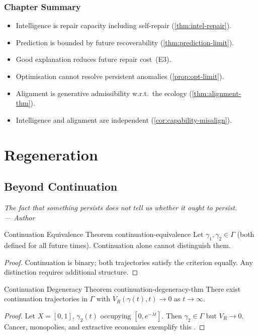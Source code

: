 \documentclass[12pt,twoside,openright]{book}
\newenvironment{epigraph}[2]{%
  \vspace{1em}\begin{flushright}
  \begin{minipage}{0.72\textwidth}
  \itshape\small #1\\[0.4em]
  \upshape\footnotesize\sffamily\color{DistGray}--- #2
  \end{minipage}\end{flushright}\vspace{1.5em}}{}
\newenvironment{chapsummary}{%
  \begin{tcolorbox}[colback=DistBlue!5,colframe=DistBlue,
    title={\faBookOpen\enspace Summary},
    fonttitle=\sffamily\bfseries\color{white},
    attach boxed title to top left={yshift=-2mm,xshift=4mm},
    boxed title style={colback=DistBlue,rounded corners}]
  \begin{itemize}[nosep,leftmargin=*]}{%
  \end{itemize}\end{tcolorbox}}
\begin{document}
\section*{Chapter Summary}
\begin{chapsummary}
  \item Intelligence is repair capacity including
        self-repair (\cref{thm:intel-repair}).
  \item Prediction is bounded by future recoverability
        (\cref{thm:prediction-limit}).
  \item Good explanation reduces future repair cost~(E3).
  \item Optimisation cannot resolve persistent anomalies
        (\cref{prop:opt-limit}).
  \item Alignment is generative admissibility
        w.r.t.\ the ecology (\cref{thm:alignment-thm}).
  \item Intelligence and alignment are independent
        (\cref{cor:capability-misalign}).
\end{chapsummary}

\part{Regeneration}

\chapter{Beyond Continuation}
\label{ch:beyond-continuation}
\begin{epigraph}{The fact that something persists does not
  tell us whether it ought to persist.}{Author}
\end{epigraph}

\begin{theorem}{Continuation Equivalence Theorem}%
  {continuation-equivalence}
  Let $\gamma_1,\gamma_2\in\Gamma$ (both defined for all
  future times). Continuation alone cannot distinguish them.
\end{theorem}
\begin{proof}
  Continuation is binary; both trajectories satisfy the
  criterion equally. Any distinction requires additional
  structure.
\end{proof}

\begin{theorem}{Continuation Degeneracy Theorem}%
  {continuation-degeneracy-thm}
  There exist continuation trajectories in $\Gamma$ with
  $V_R(\gamma(t),t)\to0$ as $t\to\infty$.
\end{theorem}
\begin{proof}
  Let $X=[0,1]$, $\gamma_2(t)$ occupying $[0,e^{-\lambda t}]$.
  Then $\gamma_2\in\Gamma$ but $V_R\to0$.
  Cancer, monopolies, and extractive economies exemplify
  this \parencite{ostrom1990,meadows2008}.
\end{proof}
\end{document}
